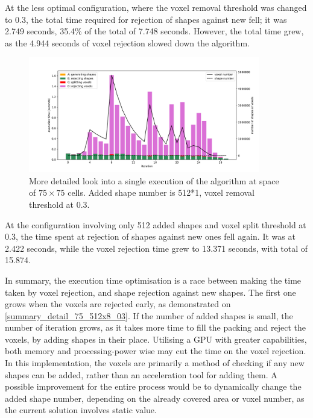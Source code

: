 \documentclass[12pt, oneside]{report}
\begin{document}
At the less optimal configuration, where the voxel removal threshold was changed to 0.3, the total time required for rejection of shapes against new fell; it was 2.749 seconds, 35.4\% of the total of 7.748 seconds. However, the total time grew, as the 4.944 seconds of voxel rejection slowed down the algorithm.

\begin{figure}[H]
  \centering
	\includegraphics[width=0.9\textwidth,keepaspectratio]{Images/SummaryOptimisation/iter_75_512x1_03_v2.pdf}
	\caption{More detailed look into a single execution of the algorithm at space of $75 \times 75$ cells. Added shape number is 512*1, voxel removal threshold at 0.3.}
	\label{summary_detail_75_512x1_03}
\end{figure}

At the configuration involving only 512 added shapes and voxel split threshold at 0.3, the time spent at rejection of shapes against new ones fell again. It was at 2.422 seconds, while the voxel rejection time grew to 13.371 seconds, with total of 15.874. \newline

In summary, the execution time optimisation is a race between making the time taken by voxel rejection, and shape rejection against new shapes. The first one grows when the voxels are rejected early, as demonstrated on \ref{summary_detail_75_512x8_03}. If the number of added shapes is small, the number of iteration grows, as it takes more time to fill the packing and reject the voxels, by adding shapes in their place. Utilising a GPU with greater capabilities, both memory and processing-power wise may cut the time on the voxel rejection. \newline
In this implementation, the voxels are primarily a method of checking if any new shapes can be added, rather than an acceleration tool for adding them. A possible improvement for the entire process would be to dynamically change the added shape number, depending on the already covered area or voxel number, as the current solution involves static value.
\end{document}
